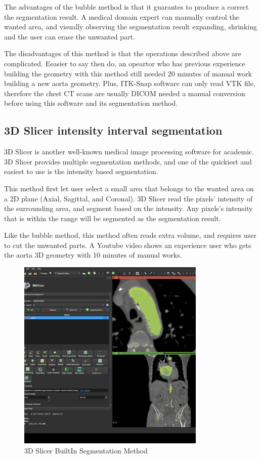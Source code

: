 The advantages of the bubble method is that it guarantes to produce a correct the segmentation result. A medical domain expert can manually control the wanted area, and visually observing the segmentation result expanding, shrinking and the user can erase the unwanted part.

The disadvantages of this method is that the operations described above are complicated. Eeasier to say then do, an opeartor who has previous experience building the geometry with this method still needed 20 minutes of manual work building a new aorta geometry. Plus, ITK-Snap software can only read VTK file, therefore the chest CT scans are usually DICOM needed a manual conversion before using this software and its segmentation method.

\subsection{3D Slicer intensity interval segmentation}
3D Slicer is another well-known medical image processing software for academic. 3D Slicer provides multiple segmentation methods, and one of the quickiest and easiest to use is the intensity based segmentation.

This method first let user select a small area that belongs to the wanted area on a 2D plane (Axial, Sagittal, and Coronal). 3D Slicer read the pixels' intensity of the surrounding area, and segment based on the intensity. Any pixels's intensity that is within the range will be segmented as the segmentation result. 

Like the bubble method, this method often reads extra volume, and requires user to cut the unwanted parts. A Youtube video shows an experience user who gets the aorta 3D geometry with 10 minutes of manual works.

\begin{figure}[H]
    \centering
    \includegraphics[width=0.8\textwidth]{figures/Sample/3D-Slicer-Segmentation.png}
    \caption[3D Slicer BuiltIn Segmentation UI]{3D Slicer BuiltIn Segmentation Method}
    \label{fig_3D_Seg_Builtin}
\end{figure}

